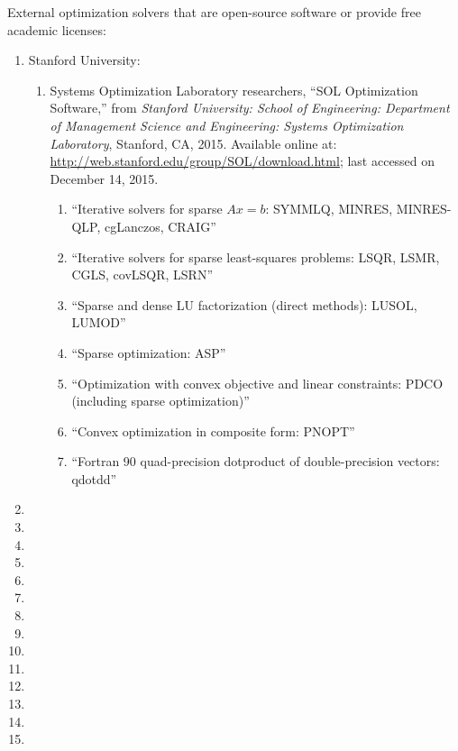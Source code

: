 External optimization solvers that are open-source software or provide free academic licenses: \vspace{-0.3cm}
\begin{enumerate} \itemsep -4pt
\item Stanford University: \vspace{-0.3cm}
	\begin{enumerate} \itemsep -2pt
	\item Systems Optimization Laboratory researchers, ``SOL Optimization Software,'' from {\it Stanford University: School of Engineering: Department of Management Science and Engineering: Systems Optimization Laboratory}, Stanford, CA, 2015. Available online at: \url{http://web.stanford.edu/group/SOL/download.html}; last accessed on December 14, 2015. \vspace{-0.2cm}
		\begin{enumerate} \itemsep -2pt
		\item ``Iterative solvers for sparse $Ax = b$: SYMMLQ, MINRES, MINRES-QLP, cgLanczos, CRAIG''
		\item ``Iterative solvers for sparse least-squares problems: LSQR, LSMR, CGLS, covLSQR, LSRN''
		\item ``Sparse and dense LU factorization (direct methods): LUSOL, LUMOD''
		\item ``Sparse optimization: ASP''
		\item ``Optimization with convex objective and linear constraints: PDCO (including sparse optimization)''
		\item ``Convex optimization in composite form: PNOPT''
		\item ``Fortran 90 quad-precision dotproduct of double-precision vectors: qdotdd''
		\end{enumerate}
	\end{enumerate}
\item 
\item 
\item 
\item 
\item 
\item 
\item 
\item 
\item 
\item 
\item 
\item 
\item 
\item 
\end{enumerate}








